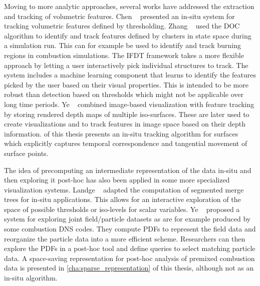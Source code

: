 %
Moving to more analytic approaches, several works have addressed the extraction
and tracking of volumetric features.
%
Chen \etal~\cite{Chen2003} presented an in-situ system for tracking volumetric
features defined by thresholding.
%
Zhang \etal~\cite{Zhang2012} used the \ac{DOC} algorithm \cite{Quiroz2008} to
identify and track features defined by clusters in state space during a
simulation run.
%
This can for example be used to identify and track burning regions in combustion
simulations.
%
The IFDT framework \cite{Duque2012} takes a more flexible approach by letting a
user interactively pick individual structures to track.
%
The system includes a machine learning component that learns to identify the
features picked by the user based on their visual properties.
%
This is intended to be more robust than detection based on thresholds which
might not be applicable over long time periods.
%
Ye \etal~\cite{Ye2015} combined image-based visualization with feature tracking
by storing rendered depth maps of multiple iso-surfaces.
%
These are later used to create visualizations and to track features in image
space based on their depth information.
%
 of this thesis presents an in-situ tracking
algorithm for surfaces which explicitly captures temporal correspondence and
tangential movement of surface points.
%

%
The idea of precomputing an intermediate representation of the data in-situ and
then exploring it post-hoc has also been applied in some more specialized
visualization systems.
%
Landge \etal~\cite{Landge2014} adapted the computation of segmented merge trees
\cite{Bremer2009,Bremer2011} for in-situ applications.
%
This allows for an interactive exploration of the space of possible thresholds
or iso-levels for scalar variables.
%
Ye \etal~\cite{Ye2016} proposed a system for exploring joint field/particle
datasets as are for example produced by some combustion \ac{DNS} codes.
%
They compute \acp{PDF} to represent the field data and reorganize the particle
data into a more efficient scheme.
%
Researchers can then explore the \acp{PDF} in a post-hoc tool and define queries
to select matching particle data.
%
A space-saving representation for post-hoc analysis of premixed combustion data
is presented in \cref{cha:sparse_representation} of this thesis, although not as
an in-situ algorithm.
%
%
%
%
%
